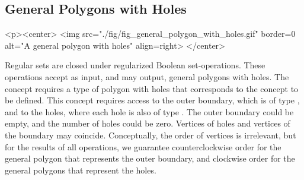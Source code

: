 \subsection{General Polygons with Holes}
\label{bso_ssec:general_polygons_with_holes}
\lcHtml{\label{fig:general_polygon_with_holes}}
\begin{ccHtmlOnly}
  <p><center>
    <img src="./fig/fig_general_polygon_with_holes.gif" border=0 alt="A
    general polygon with holes" align=right>
  </center>
\end{ccHtmlOnly}
Regular sets are closed under regularized Boolean set-operations.
These operations accept as input, and may output, general
polygons with holes. The concept 
requires a type of polygon with holes that corresponds to the concept
 to be defined. This concept requires 
access to the outer boundary, which is of type ,
and to the holes, where each hole is also of type .
The outer boundary could be empty, and the number of holes could be
zero. Vertices of holes and vertices of the boundary may coincide.
Conceptually, the order of vertices is irrelevant, but for the results
of all operations, we guarantee counterclockwise order for the general
polygon that represents the outer boundary, and clockwise order for
the general polygons that represent the holes.

